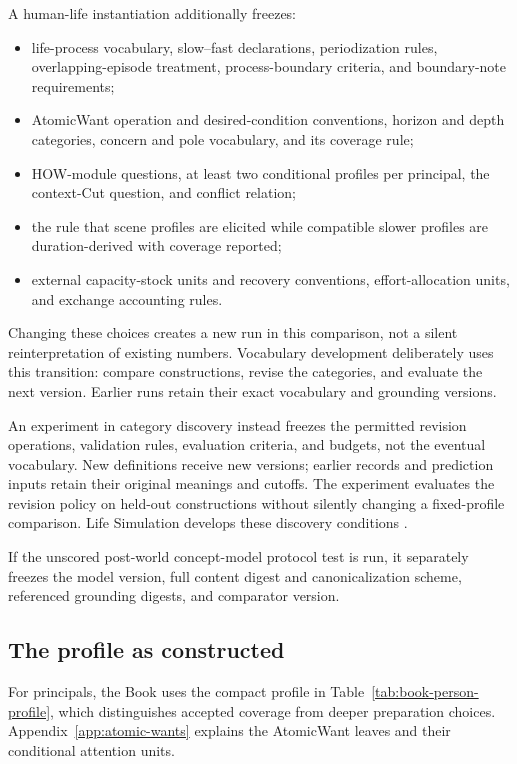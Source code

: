\documentclass[11pt,a4paper]{article}
\begin{document}
A human-life instantiation additionally freezes:
\begin{itemize}
  \item life-process vocabulary, slow--fast declarations, periodization rules,
    overlapping-episode treatment, process-boundary criteria, and boundary-note requirements;
  \item AtomicWant operation and desired-condition conventions, horizon and depth
    categories, concern and pole vocabulary, and its coverage rule;
  \item HOW-module questions, at least two conditional profiles per principal,
    the context-Cut question, and conflict relation;
  \item the rule that scene profiles are elicited while compatible slower
    profiles are duration-derived with coverage reported;
  \item external capacity-stock units and recovery conventions, effort-allocation
    units, and exchange accounting rules.
\end{itemize}
Changing these choices creates a new run in this comparison, not a silent
reinterpretation of existing numbers. Vocabulary development deliberately uses this transition:
compare constructions, revise the categories, and evaluate the next version.
Earlier runs retain their exact vocabulary and grounding versions.

An experiment in category discovery instead freezes the permitted revision
operations, validation rules, evaluation criteria, and budgets, not the
eventual vocabulary. New definitions receive new versions; earlier records and
prediction inputs retain their original meanings and cutoffs. The experiment
evaluates the revision policy on held-out constructions without silently
changing a fixed-profile comparison. Life Simulation develops these discovery
conditions \cite{westerbergLifeSimulation2026}.

If the unscored post-world concept-model protocol test is run, it separately
freezes the model version, full content digest and canonicalization scheme,
referenced grounding digests, and comparator version.

\subsection{The profile as constructed}
\label{app:book-profile}

For principals, the Book uses the compact profile in
Table~\ref{tab:book-person-profile}, which distinguishes accepted coverage from
deeper preparation choices.
Appendix~\ref{app:atomic-wants} explains the AtomicWant leaves and their
conditional attention units.
\end{document}
